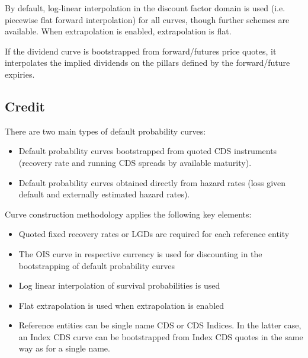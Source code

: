 \medskip
By default, log-linear interpolation in the discount factor domain is used (i.e. 
piecewise flat forward interpolation) for all curves, though further schemes are 
available.  When extrapolation is enabled, extrapolation is flat.

If the dividend curve is bootstrapped from forward/futures price quotes, it interpolates the implied dividends on the
pillars defined by the forward/future expiries.

\subsection{Credit}

There are two main types of default probability curves: 
\begin{itemize}
\item Default probability curves bootstrapped from quoted CDS instruments (recovery 
rate and running CDS spreads by available maturity). 
\item Default probability curves obtained directly from hazard rates (loss 
given default and externally estimated hazard rates). 
\end{itemize}

\medskip
Curve construction methodology applies the following key elements:
\begin{itemize}
\item Quoted fixed recovery rates or LGDs are required for each reference entity
%
%
\item The OIS curve in respective currency is used for discounting in the 
bootstrapping of default probability curves
\item Log linear interpolation of survival probabilities is used
\item Flat extrapolation is used when extrapolation is enabled
\item Reference entities can be single name CDS or CDS Indices. In the latter case, 
an Index CDS curve can be bootstrapped from Index CDS quotes in the same way as for 
a single name.
\end{itemize}


